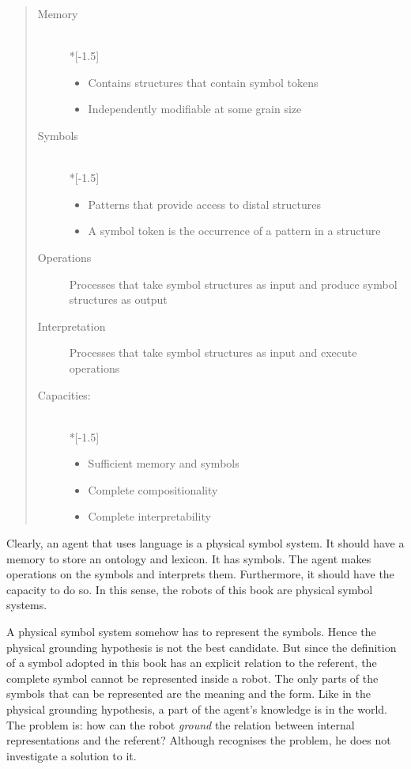 \begin{quote}
\begin{description}
\item[Memory]\mbox{}\\*[-1.5\baselineskip]
\begin{itemize}
	\item Contains structures that contain symbol tokens
	\item Independently modifiable at some grain size
\end{itemize}
\item[Symbols]\mbox{}\\*[-1.5\baselineskip]
\begin{itemize}
\item Patterns that provide access to distal structures
\item A symbol token is the occurrence of a pattern in a structure
\end{itemize}

\item[Operations]
Processes that take symbol structures as input and produce symbol structures as output

\item[Interpretation] Processes that take symbol structures as input and execute operations

\item[Capacities:]\mbox{}\\*[-1.5\baselineskip]\begin{itemize}
\item Sufficient memory and symbols
\item Complete compositionality
\item Complete interpretability
\end{itemize}
\end{description}
\end{quote}


Clearly, an agent that uses language is a physical symbol system. It should have a memory to store an ontology and lexicon. It has symbols. The agent makes operations on the symbols and interprets them. Furthermore, it should have the capacity to do so. In this sense, the robots of this book are physical symbol systems.

A physical symbol system somehow has to represent the symbols. Hence the physical grounding hypothesis is not the best candidate. But since the definition of a symbol adopted in this book has an explicit relation to the referent, the complete symbol cannot be represented inside a robot. The only parts of the symbols that can be represented are the meaning and the form. Like in the physical grounding hypothesis, a part of the agent's knowledge is in the world. The problem is: how can the robot {\em ground} the relation between internal representations and the referent? Although \citet{newell:1990} recognises the problem, he does not investigate a solution to it.


